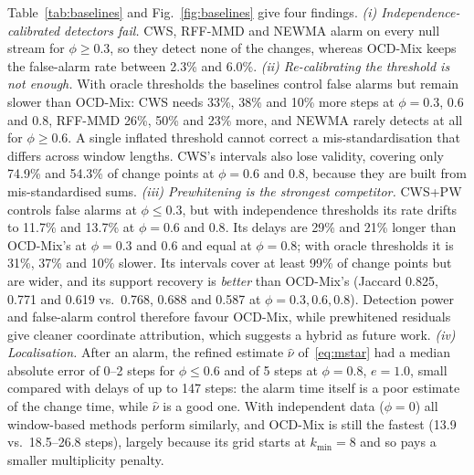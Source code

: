 Table~\ref{tab:baselines} and Fig.~\ref{fig:baselines} give four findings. \emph{(i) Independence-calibrated detectors fail.} CWS, RFF-MMD and NEWMA alarm on every null stream for $\phi\ge 0.3$, so they detect none of the changes, whereas OCD-Mix keeps the false-alarm rate between 2.3\% and 6.0\%. \emph{(ii) Re-calibrating the threshold is not enough.} With oracle thresholds the baselines control false alarms but remain slower than OCD-Mix: CWS needs 33\%, 38\% and 10\% more steps at $\phi=0.3$, $0.6$ and $0.8$, RFF-MMD 26\%, 50\% and 23\% more, and NEWMA rarely detects at all for $\phi\ge 0.6$. A single inflated threshold cannot correct a mis-standardisation that differs across window lengths. CWS's intervals also lose validity, covering only 74.9\% and 54.3\% of change points at $\phi=0.6$ and $0.8$, because they are built from mis-standardised sums. \emph{(iii) Prewhitening is the strongest competitor.} CWS+PW controls false alarms at $\phi\le 0.3$, but with independence thresholds its rate drifts to 11.7\% and 13.7\% at $\phi=0.6$ and $0.8$. Its delays are 29\% and 21\% longer than OCD-Mix's at $\phi=0.3$ and $0.6$ and equal at $\phi=0.8$; with oracle thresholds it is 31\%, 37\% and 10\% slower. Its intervals cover at least 99\% of change points but are wider, and its support recovery is \emph{better} than OCD-Mix's (Jaccard 0.825, 0.771 and 0.619 vs.\ 0.768, 0.688 and 0.587 at $\phi=0.3,0.6,0.8$). Detection power and false-alarm control therefore favour OCD-Mix, while prewhitened residuals give cleaner coordinate attribution, which suggests a hybrid as future work. \emph{(iv) Localisation.} After an alarm, the refined estimate $\hat\nu$ of~\eqref{eq:mstar} had a median absolute error of 0--2 steps for $\phi\le 0.6$ and of 5 steps at $\phi=0.8$, $e=1.0$, small compared with delays of up to 147 steps: the alarm time itself is a poor estimate of the change time, while $\hat\nu$ is a good one. With independent data ($\phi=0$) all window-based methods perform similarly, and OCD-Mix is still the fastest (13.9 vs.\ 18.5--26.8 steps), largely because its grid starts at $k_{\min}=8$ and so pays a smaller multiplicity penalty.

